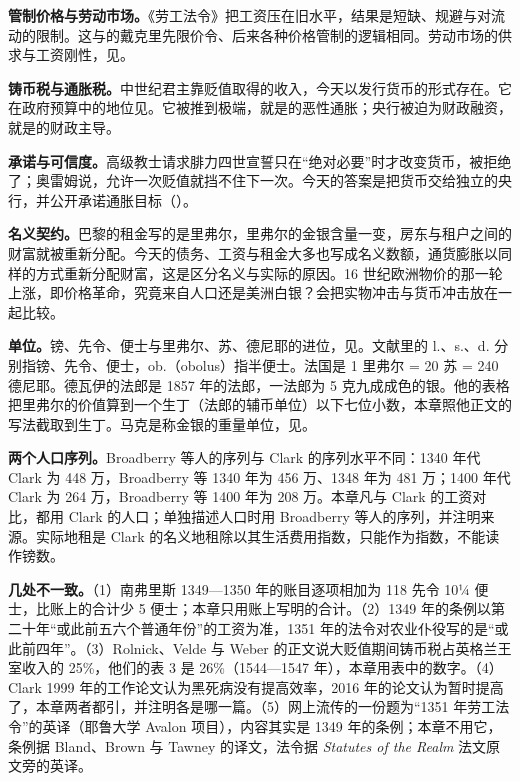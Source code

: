 \textbf{管制价格与劳动市场。}《劳工法令》把工资压在旧水平，结果是短缺、规避与对流动的限制。这与的戴克里先限价令、后来各种价格管制的逻辑相同。劳动市场的供求与工资刚性，见。

\textbf{铸币税与通胀税。}中世纪君主靠贬值取得的收入，今天以发行货币的形式存在。它在政府预算中的地位见。它被推到极端，就是的恶性通胀；央行被迫为财政融资，就是的财政主导。

\textbf{承诺与可信度。}高级教士请求腓力四世宣誓只在“绝对必要”时才改变货币，被拒绝了；奥雷姆说，允许一次贬值就挡不住下一次。今天的答案是把货币交给独立的央行，并公开承诺通胀目标（）。

\textbf{名义契约。}巴黎的租金写的是里弗尔，里弗尔的金银含量一变，房东与租户之间的财富就被重新分配。今天的债务、工资与租金大多也写成名义数额，通货膨胀以同样的方式重新分配财富，这是区分名义与实际的原因。16 世纪欧洲物价的那一轮上涨，即价格革命，究竟来自人口还是美洲白银？会把实物冲击与货币冲击放在一起比较。

\begin{deeper}[单位、数据与几处不一致]
\textbf{单位。}镑、先令、便士与里弗尔、苏、德尼耶的进位，见。文献里的 l.、s.、d. 分别指镑、先令、便士，ob.（obolus）指半便士。法国是 1 里弗尔 = 20 苏 = 240 德尼耶。德瓦伊的法郎是 1857 年的法郎，一法郎为 5 克九成成色的银。他的表格把里弗尔的价值算到一个生丁（法郎的辅币单位）以下七位小数，本章照他正文的写法截取到生丁。马克是称金银的重量单位，见。

\textbf{两个人口序列。}Broadberry 等人的序列与 Clark 的序列水平不同：1340 年代 Clark 为 448 万，Broadberry 等 1340 年为 456 万、1348 年为 481 万；1400 年代 Clark 为 264 万，Broadberry 等 1400 年为 208 万。本章凡与 Clark 的工资对比，都用 Clark 的人口；单独描述人口时用 Broadberry 等人的序列，并注明来源。实际地租是 Clark 的名义地租除以其生活费用指数，只能作为指数，不能读作镑数。

\textbf{几处不一致。}（1）南弗里斯 1349—1350 年的账目逐项相加为 118 先令 10¼ 便士，比账上的合计少 5 便士；本章只用账上写明的合计。（2）1349 年的条例以第二十年“或此前五六个普通年份”的工资为准，1351 年的法令对农业仆役写的是“或此前四年”。（3）Rolnick、Velde 与 Weber 的正文说大贬值期间铸币税占英格兰王室收入的 25\%，他们的表 3 是 26\%（1544—1547 年），本章用表中的数字。（4）Clark 1999 年的工作论文认为黑死病没有提高效率，2016 年的论文认为暂时提高了，本章两者都引，并注明各是哪一篇。（5）网上流传的一份题为“1351 年劳工法令”的英译（耶鲁大学 Avalon 项目），内容其实是 1349 年的条例；本章不用它，条例据 Bland、Brown 与 Tawney 的译文，法令据 \emph{Statutes of the Realm} 法文原文旁的英译。
\end{deeper}

